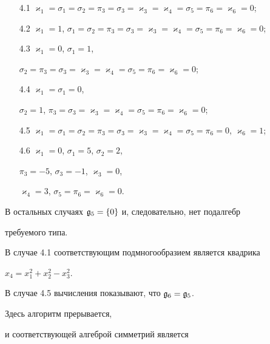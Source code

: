 \begin{itemize}


\item[4.1] $\varkappa_1=\sigma_1=\sigma_2=\pi_3=\sigma_3=


\varkappa_3=\varkappa_4=\sigma_5=\pi_6=\varkappa_6=0$;


\item[4.2] $\varkappa_1=1$, $\sigma_1=\sigma_2=\pi_3=


\sigma_3=\varkappa_3=\varkappa_4=\sigma_5=\pi_6=\varkappa_6=0$;


\item[4.3] $\varkappa_1=0$, $\sigma_1=1$,


$\sigma_2=\pi_3=\sigma_3=\varkappa_3=\varkappa_4=


\sigma_5=\pi_6=\varkappa_6=0$;


\item[4.4] $\varkappa_1=\sigma_1=0$,


$\sigma_2=1$, $\pi_3=\sigma_3=\varkappa_3=\varkappa_4=\sigma_5=


\pi_6=\varkappa_6=0$;


\item[4.5] $\varkappa_1=\sigma_1=\sigma_2=\pi_3=\sigma_3=


\varkappa_3=\varkappa_4=\sigma_5=\pi_6=0$, $\varkappa_6=1$;


\item[4.6] $\varkappa_1=0$, $\sigma_1=5$, $\sigma_2=2$,


$\pi_3=-5$, $\sigma_3=-1$, $\varkappa_3=0$,


$\varkappa_4=3$, $\sigma_5=\pi_6=\varkappa_6=0$.


\end{itemize}


В остальных случаях $\frak g_5=\{0\}$ и, следовательно, нет подалгебр


требуемого типа.


 


В случае 4.1 соответствующим подмногообразием является квадрика


$x_4=x_1^2+x_2^2-x_3^2$.





В случае 4.5 вычисления показывают, что $\frak g_6=\frak g_5$.


Здесь алгоритм прерывается,


и соответствующей алгеброй симметрий является


$$


